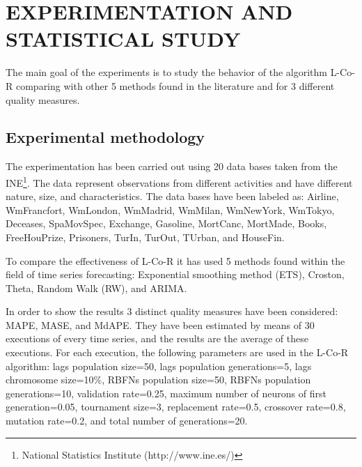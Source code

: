 \documentclass[a4paper,twoside]{article}
\newcommand{\metodo}{L-Co-R}
\begin{document}
\section{\uppercase{Experimentation and statistical study}}
\label{sec:experimentation}

\noindent The main goal of the experiments is to study the behavior of the algorithm {\metodo} comparing with other 5 methods found in the literature and for 3 different quality measures. %


\subsection{Experimental methodology}
\label{experimentalmethodoly}

\noindent The experimentation has been carried out using 20 data bases taken from the INE\footnote{National Statistics Institute (http://www.ine.es/)}. The data represent observations from different activities and have different nature, size, and characteristics. The data bases have been labeled as: Airline, WmFrancfort, WmLondon, WmMadrid, WmMilan, WmNewYork, WmTokyo, Deceases, SpaMovSpec, Exchange, Gasoline, MortCanc, MortMade, Books, FreeHouPrize, Prisoners, TurIn, TurOut, TUrban, and HouseFin. %


To compare the effectiveness of {\metodo} it has used 5 methods found
within the field of time series forecasting: Exponential smoothing
method (ETS), Croston, Theta, Random Walk (RW), and ARIMA. %


In order to show the results 3 distinct quality measures have been
considered: MAPE, MASE, and MdAPE. They have been estimated by means
of 30 executions of every time series, and the results are the average
of these executions. For each execution, the following parameters are
used in the {\metodo} algorithm: lags population size=50, lags
population generations=5, lags chromosome size=10\%, RBFNs population
size=50, RBFNs population generations=10, validation rate=0.25,
maximum number of neurons of first generation=0.05, tournament size=3,
replacement rate=0.5, crossover rate=0.8, mutation rate=0.2, and total
number of generations=20. 
\end{document}
